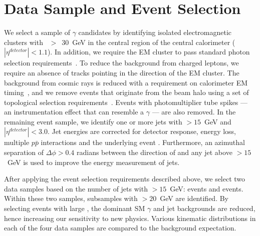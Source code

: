 \documentclass[12pt,twoside,letterpaper,doublespace]{article}
\begin{document}

\section{Data Sample and Event Selection}
We select a sample of $\gamma$ candidates by identifying isolated electromagnetic clusters with \et~$>$~30~GeV in the central region of the central calorimeter ($|\eta^{detector}|<1.1$). In addition, we require the EM cluster to pass standard photon selection requirements~\cite{ref:PhotonIDAndCESCPR}. To reduce the background from charged leptons, we require an absence of tracks pointing in the direction of the EM cluster. The background from cosmic rays is reduced with a requirement on calorimeter EM timing~\cite{ref:EMtiming}, and we remove events that originate from the beam halo using a set of topological selection requirements~\cite{cdfnote:8409}. Events with photomultiplier tube spikes --- an instrumentation effect that can resemble a $\gamma$ --- are also removed. In the remaining event sample, we identify one or more jets with \mbox{\et$>15$~GeV} and $|\eta^{detector}|<3.0$. Jet energies are corrected for detector response, energy loss, multiple $p\bar{p}$ interactions and the underlying event \cite{pap:JetCorrections}. Furthermore, an azimuthal separation of $\Delta\phi>0.4$ radians between the direction of \met and any jet above \et$>15$~GeV is used to improve the energy measurement of jets.

After applying the event selection requirements described above, we select two data samples based on the number of jets with \et$>15$~GeV: \phoonejet events and \photwojet events. Within these two samples, subsamples with \mbox{\met$>20$~GeV} are identified. By selecting events with large \met, the dominant SM $\gamma$ and jet backgrounds are reduced, hence increasing our sensitivity to new physics. Various kinematic distributions in each of the four data samples are compared to the background expectation. %
\end{document}
